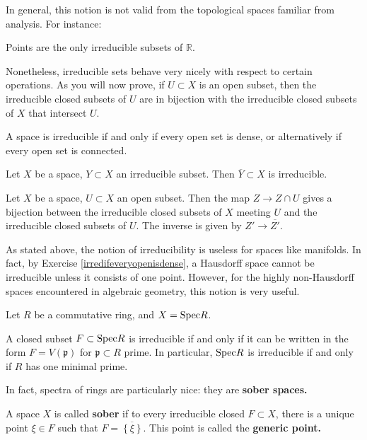 In general, this notion is not valid from the topological spaces familiar from
analysis. For instance:

\begin{exercise} 
Points are the only irreducible subsets of $\mathbb{R}$.
\end{exercise} 

Nonetheless, irreducible sets behave very nicely with respect to certain
operations. As you will now prove, if $U \subset X$ is an open subset, then
the irreducible closed subsets of $U$ are in bijection with the irreducible
closed subsets of $X$ that intersect $U$. 
\begin{exercise} \label{irredifeveryopenisdense}
A space is irreducible if and only if every open set is dense, or
alternatively if every open set is connected.
\end{exercise} 

\begin{exercise} 
Let $X$ be a space, $Y \subset X$ an irreducible subset. Then 
$\overline{Y} \subset X$ is irreducible.
\end{exercise} 

\begin{exercise} 
Let $X$ be a space, $U \subset X$ an open subset. 
Then the map $Z \to Z \cap U$ gives a bijection between the irreducible
closed subsets of $X$ meeting $U$ and the irreducible closed subsets of $U$.
The inverse is given by $Z' \to \overline{Z'}$.
\end{exercise} 

As stated above, the  notion of irreducibility is useless for spaces
like manifolds. In fact, by Exercise \ref{irredifeveryopenisdense}, a
Hausdorff space cannot be irreducible unless it consists of one point.
However, for the highly non-Hausdorff spaces encountered in algebraic geometry, this notion is very
useful.

Let $R$ be a commutative ring, and $X = \mathrm{Spec} R$.

\begin{exercise} 
A closed subset $F \subset \mathrm{Spec} R$ is irreducible if and only if it can be
written in the form $F = V(\mathfrak{p})$ for $\mathfrak{p} \subset R$ prime.
In particular, $\mathrm{Spec} R$ is irreducible if and only if $R$ has one minimal
prime. 
\end{exercise} 

In fact, spectra of rings are particularly nice: they are \textbf{sober
spaces.}
\begin{definition} 
A space $X$ is called \textbf{sober} if to every irreducible closed $F \subset
X$, there is a unique point $\xi \in F$ such that $F = \overline{ \left\{\xi\right\}}$. 
This point is called the \textbf{generic point.}
\end{definition} 

